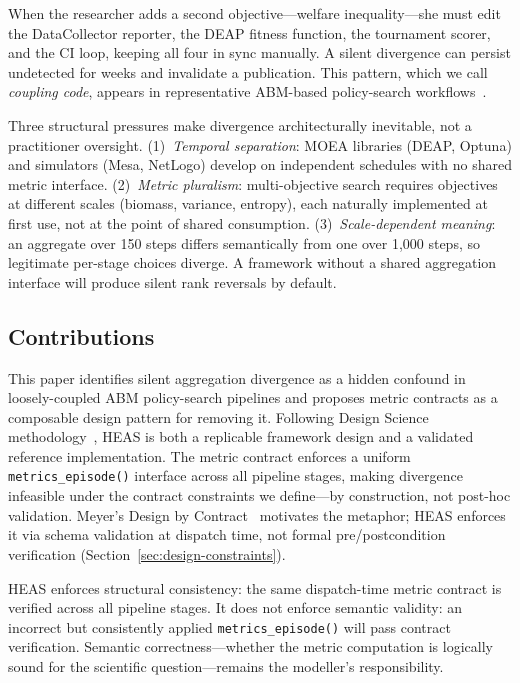 \documentclass{wscpaperproc}
\begin{document}
When the researcher adds a second objective---welfare inequality---she must edit
the DataCollector reporter, the DEAP fitness function, the tournament scorer, and
the CI loop, keeping all four in sync manually. A silent divergence can persist
undetected for weeks and invalidate a publication. This pattern, which we call
\emph{coupling code}, appears in representative ABM-based policy-search
workflows~\cite{pangallo2019best,capri2023transport}.

Three structural pressures make divergence architecturally inevitable, not a
practitioner oversight. (1)~\emph{Temporal separation}: MOEA libraries (DEAP,
Optuna) and simulators (Mesa, NetLogo) develop on independent schedules with no
shared metric interface. (2)~\emph{Metric pluralism}: multi-objective search
requires objectives at different scales (biomass, variance, entropy), each
naturally implemented at first use, not at the point of shared consumption.
(3)~\emph{Scale-dependent meaning}: an aggregate over 150 steps differs
semantically from one over 1,000 steps, so legitimate per-stage choices diverge.
A framework without a shared aggregation interface will produce silent rank
reversals by default.

\subsection{Contributions}
\label{sec:intro-contributions}

This paper identifies silent aggregation divergence as a hidden confound in
loosely-coupled ABM policy-search pipelines and proposes metric contracts as a
composable design pattern for removing it. Following Design Science
methodology~\cite{hevner2004design}, HEAS is both a replicable framework design
and a validated reference implementation. The metric contract enforces a uniform
\texttt{metrics\_episode()} interface across all pipeline stages, making
divergence infeasible under the contract constraints we
define---by construction, not post-hoc validation. Meyer's Design by
Contract~\cite{meyer1997object} motivates the metaphor; HEAS enforces it via
schema validation at dispatch time, not formal pre/postcondition verification
(Section~\ref{sec:design-constraints}).

HEAS enforces structural consistency: the same dispatch-time metric contract is
verified across all pipeline stages. It does not enforce semantic validity: an
incorrect but consistently applied \texttt{metrics\_episode()} will pass contract
verification. Semantic correctness---whether the metric computation is logically
sound for the scientific question---remains the modeller's responsibility.
\end{document}

